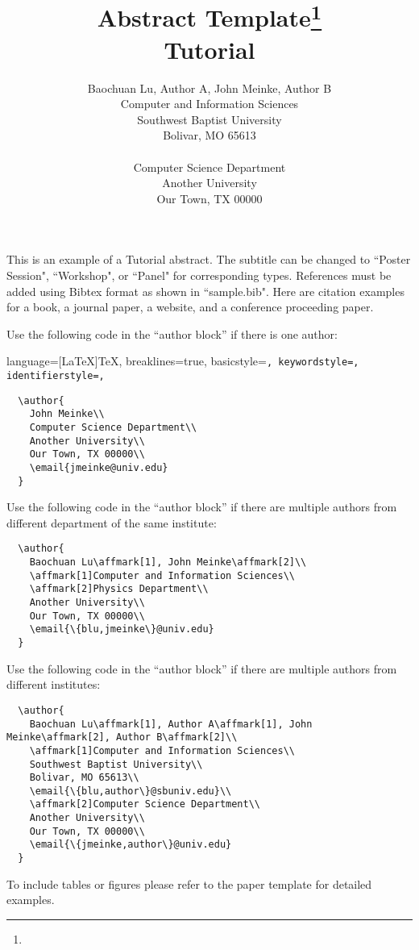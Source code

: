 \documentclass{article}
\title{Abstract Template\footnote{\protect}
\\
\vspace{0.2in}
\large{
Tutorial
}}
\author{
Baochuan Lu\affmark[1], Author A\affmark[1], John Meinke\affmark[2], Author B\affmark[2]\\
\affmark[1]Computer and Information Sciences\\
Southwest Baptist University\\
Bolivar, MO 65613\\
\email{\{blu,author\}@sbuniv.edu}\\
\affmark[2]Computer Science Department\\
Another University\\
Our Town, TX 00000\\
\email{\{jmeinke,author\}@univ.edu}
}
\begin{document}
\maketitle

This is an example of a Tutorial abstract. The subtitle can be changed to ``Poster Session", ``Workshop", or ``Panel" for corresponding types. References must be added using Bibtex format as shown in ``sample.bib". Here are citation examples for a book\cite{latexcompanion}, a journal paper\cite{einstein}, a website\cite{knuthwebsite}, and a conference proceeding paper\cite{maurer}.

Use the following code in the ``author block'' if there is one author:

\lstset
{
    language=[LaTeX]TeX,
    breaklines=true,
    basicstyle=\tt\scriptsize,
    keywordstyle=\color{blue},
    identifierstyle=\color{magenta},
}

\begin{lstlisting}
  \author{
    John Meinke\\
    Computer Science Department\\
    Another University\\
    Our Town, TX 00000\\
    \email{jmeinke@univ.edu}
  }
\end{lstlisting}

Use the following code in the ``author block'' if there are multiple authors from different department of the same institute:

\begin{lstlisting}
  \author{
    Baochuan Lu\affmark[1], John Meinke\affmark[2]\\
    \affmark[1]Computer and Information Sciences\\
    \affmark[2]Physics Department\\
    Another University\\
    Our Town, TX 00000\\
    \email{\{blu,jmeinke\}@univ.edu}
  }
\end{lstlisting}

Use the following code in the ``author block'' if there are multiple authors from different institutes:
\begin{lstlisting}
  \author{
    Baochuan Lu\affmark[1], Author A\affmark[1], John Meinke\affmark[2], Author B\affmark[2]\\
    \affmark[1]Computer and Information Sciences\\
    Southwest Baptist University\\
    Bolivar, MO 65613\\
    \email{\{blu,author\}@sbuniv.edu}\\
    \affmark[2]Computer Science Department\\
    Another University\\
    Our Town, TX 00000\\
    \email{\{jmeinke,author\}@univ.edu}
  }
\end{lstlisting}

To include tables or figures please refer to the paper template for detailed examples.



\end{document}

